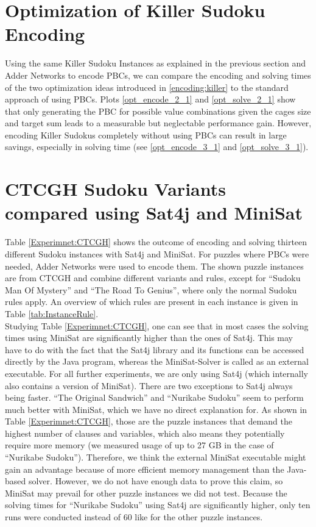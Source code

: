 \section{Optimization of Killer Sudoku Encoding}
Using the same Killer Sudoku Instances as explained in the previous section and Adder Networks to encode PBCs, we can compare the encoding and solving times of the two optimization ideas introduced in \ref{encoding:killer} to the standard approach of using PBCs. Plots \ref{opt_encode_2_1} and \ref{opt_solve_2_1} show that only generating the PBC for possible value combinations given the cages size and target sum leads to a measurable but neglectable performance gain. However, encoding Killer Sudokus completely without using PBCs can result in large savings, especially in solving time (see \ref{opt_encode_3_1} and \ref{opt_solve_3_1}).

\section{CTCGH Sudoku Variants compared using Sat4j and MiniSat}
Table \ref{Experimnet:CTCGH} shows the  outcome of encoding and solving thirteen different Sudoku instances with Sat4j and MiniSat. For puzzles where PBCs were needed, Adder Networks were used to encode them. The shown puzzle instances are from CTCGH and combine different variants and rules, except for ``Sudoku Man Of Mystery'' and ``The Road To Genius'', where only the normal Sudoku rules apply. An overview of which rules are present in each instance is given in Table \ref{tab:InstanceRule}.\\

Studying Table \ref{Experimnet:CTCGH}, one can see that in most cases the solving times using MiniSat are significantly higher than the ones of Sat4j. This may have to do with the fact that the Sat4j library and its functions can be accessed directly by the Java program, whereas the MiniSat-Solver is called as an external executable. For all further experiments, we are only using Sat4j (which internally also contains a version of MiniSat). There are two exceptions to Sat4j always being faster. ``The Original Sandwich'' and ``Nurikabe Sudoku'' seem to perform much better with MiniSat, which we have no direct explanation for. As shown in Table \ref{Experimnet:CTCGH}, those are the puzzle instances that demand the highest number of clauses and variables, which also means they potentially require more memory (we measured usage of up to 27 GB in the case of ``Nurikabe Sudoku''). Therefore, we think the external MiniSat executable might gain an advantage because of more efficient memory management than the Java-based solver. However, we do not have enough data to prove this claim, so MiniSat may prevail for other puzzle instances we did not test. Because the solving times for ``Nurikabe Sudoku'' using Sat4j are significantly higher, only ten runs were conducted instead of 60 like for the other puzzle instances.\\


